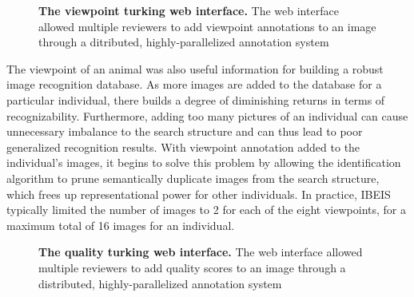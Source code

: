 \begin{figure}[t]%
	\centering
    	\caption[The Viewpoint Turking Web Interface]{\textbf{The viewpoint turking web interface.}  The web interface allowed multiple reviewers to add viewpoint annotations to an image through a ditributed, highly-parallelized annotation system}
    	\label{fig:turking_interface_viewpoint}
\end{figure}

The viewpoint of an animal was also useful information for building a robust image recognition database.  As more images are added to the database for a particular individual, there builds a degree of diminishing returns in terms of recognizability.  Furthermore, adding too many pictures of an individual can cause unnecessary imbalance to the search structure and can thus lead to poor generalized recognition results.  With viewpoint annotation added to the individual's images, it begins to solve this problem by allowing the identification algorithm to prune semantically duplicate images from the search structure, which frees up representational power for other individuals.  In practice, IBEIS typically limited the number of images to 2 for each of the eight viewpoints, for a maximum total of 16 images for an individual.

\begin{figure}[t]%
	\centering
    	\caption[The Quality Turking Web Interface]{\textbf{The quality turking web interface.}  The web interface allowed multiple reviewers to add quality scores to an image through a distributed, highly-parallelized annotation system}
    	\label{fig:turking_interface_quality}
\end{figure}

